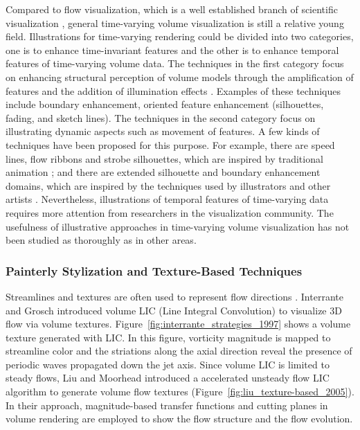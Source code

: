 Compared to flow visualization, which is a well established branch of scientific visualization \cite{brambilla_illustrative_2012}, general time-varying volume visualization is still a relative young field.
Illustrations for time-varying rendering could be divided into two categories, one is to enhance time-invariant features and the other is to enhance temporal features of time-varying volume data. The techniques in the first category focus on enhancing structural perception of volume models through the amplification of features and the addition of illumination effects \cite{rheingans_volume_2001} \cite{joshi_illustration-inspired_2005}. Examples of these techniques include boundary enhancement, oriented feature enhancement (silhouettes, fading, and sketch lines). The techniques in the second category focus on illustrating dynamic aspects such as movement of features. A few kinds of techniques have been proposed for this purpose. For example, there are speed lines, flow ribbons and strobe silhouettes, which are inspired by traditional animation \cite{joshi_illustration-inspired_2005} \cite{joshi_evaluation_2008} \cite{joshi_case_2009}; and there are extended silhouette and boundary enhancement domains, which are inspired by the techniques used by illustrators and other artists \cite{svakhine_illustration_2005}. Nevertheless, illustrations of temporal features of time-varying data requires more attention from researchers in the visualization community. The usefulness of illustrative approaches in time-varying volume visualization has not been studied as thoroughly as in other areas.

\subsubsection{Painterly Stylization and Texture-Based Techniques \label{painterly_rendering}}
Streamlines and textures are often used to represent flow directions \cite{urnessy_techniques_2004}. Interrante and Grosch \cite{interrante_strategies_1997} introduced volume LIC (Line Integral Convolution) to visualize 3D flow via volume textures. Figure~\ref{fig:interrante_strategies_1997} shows a volume texture generated with LIC. In this figure, vorticity magnitude is mapped to streamline color and the striations along the axial direction reveal the presence of periodic waves propagated down the jet axis. Since volume LIC is limited to steady flows, Liu and Moorhead \cite{liu_texture-based_2005} introduced a accelerated unsteady flow LIC algorithm to generate volume flow textures (Figure~\ref{fig:liu_texture-based_2005}). In their approach, magnitude-based transfer functions and cutting planes in volume rendering are employed to show the flow structure and the flow evolution.

